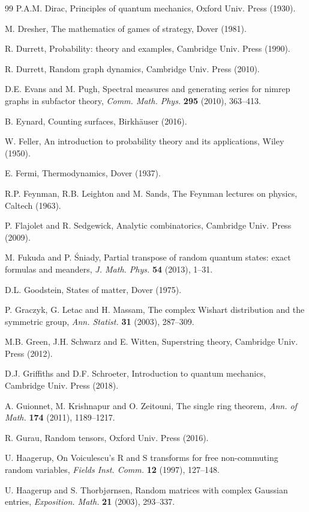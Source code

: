 \documentclass[12pt]{amsbook}
\begin{document}
\begin{thebibliography}{99}
P.A.M. Dirac, Principles of quantum mechanics, Oxford Univ. Press (1930).

M. Dresher, The mathematics of games of strategy, Dover (1981).

R. Durrett, Probability: theory and examples, Cambridge Univ. Press (1990).

R. Durrett, Random graph dynamics, Cambridge Univ. Press (2010).

D.E. Evans and M. Pugh, Spectral measures and generating series for nimrep graphs in subfactor theory, {\em Comm. Math. Phys.} {\bf 295} (2010), 363--413.

B. Eynard, Counting surfaces, Birkh\"auser (2016).

W. Feller, An introduction to probability theory and its applications, Wiley (1950).

E. Fermi, Thermodynamics, Dover (1937). 

R.P. Feynman, R.B. Leighton and M. Sands, The Feynman lectures on physics, Caltech (1963).

P. Flajolet and R. Sedgewick, Analytic combinatorics, Cambridge Univ. Press (2009).

M. Fukuda and P. \'Sniady, Partial transpose of random quantum states: exact formulas and meanders, {\em J. Math. Phys.} {\bf 54} (2013), 1--31.

D.L. Goodstein, States of matter, Dover (1975).

P. Graczyk, G. Letac and H. Massam, The complex Wishart distribution and the symmetric group, {\em Ann. Statist.} {\bf 31} (2003), 287--309.

M.B. Green, J.H. Schwarz and E. Witten, Superstring theory, Cambridge Univ. Press (2012). 

D.J. Griffiths and D.F. Schroeter, Introduction to quantum mechanics, Cambridge Univ. Press (2018).

A. Guionnet, M. Krishnapur and O. Zeitouni, The single ring theorem, {\em Ann. of Math.} {\bf 174} (2011), 1189--1217.

R. Gurau, Random tensors, Oxford Univ. Press (2016).

U. Haagerup, On Voiculescu's R and S transforms for free non-commuting random variables, {\em Fields Inst. Comm.} {\bf 12} (1997), 127--148.

U. Haagerup and S. Thorbj\o rnsen, Random matrices with complex Gaussian entries, {\em Exposition. Math.} {\bf 21} (2003), 293--337.


\end{thebibliography}
\end{document}
